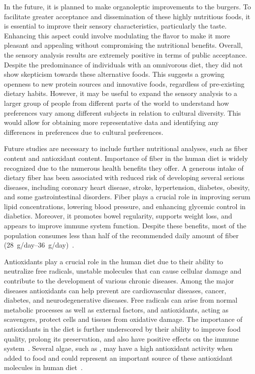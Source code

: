 In the future, it is planned to make organoleptic improvements to the  burgers. To facilitate greater acceptance and dissemination of these highly nutritious foods, it is essential to improve their sensory characteristics, particularly the taste. Enhancing this aspect could involve modulating the flavor to make it more pleasant and appealing without compromising the nutritional benefits.
Overall, the sensory analysis results are extremely positive in terms of public acceptance. Despite the predominance of individuals with an omnivorous diet, they did not show skepticism towards these alternative foods. This suggests a growing openness to new protein sources and innovative foods, regardless of pre-existing dietary habits. However, it may be useful to expand the sensory analysis to a larger group of people from different parts of the world to understand how preferences vary among different subjects in relation to cultural diversity. This would allow for obtaining more representative data and identifying any differences in preferences due to cultural preferences.

Future studies are necessary to include further nutritional analyses, such as fiber content and antioxidant content. Importance of fiber in the human diet is widely recognized due to the numerous health benefits they offer. A generous intake of dietary fiber has been associated with reduced risk of developing several serious diseases, including coronary heart disease, stroke, hypertension, diabetes, obesity, and some gastrointestinal disorders. Fiber plays a crucial role in improving serum lipid concentrations, lowering blood pressure, and enhancing glycemic control in diabetics. Moreover, it promotes bowel regularity, supports weight loss, and appears to improve immune system function. Despite these benefits, most of the population consumes less than half of the recommended daily amount of fiber (\qtyrange[range-phrase={--}]{28}{36}{\gram/day})~\parencite{anderson_Health_2009}.

Antioxidants play a crucial role in the human diet due to their ability to neutralize free radicals, unstable molecules that can cause cellular damage and contribute to the development of various chronic diseases. Among the major diseases antioxidants can help prevent are cardiovascular diseases, cancer, diabetes, and neurodegenerative diseases. Free radicals can arise from normal metabolic processes as well as external factors, and antioxidants, acting as scavengers, protect cells and tissues from oxidative damage. The importance of antioxidants in the diet is further underscored by their ability to improve food quality, prolong its preservation, and also have positive effects on the immune system~\parencite{zehiroglu_importance_2019}. Several algae, such as , may have a high antioxidant activity when added to food and could represent an important source of these antioxidant molecules in human diet~\parencite{stunda-zujeva_Comparison_2023}.

